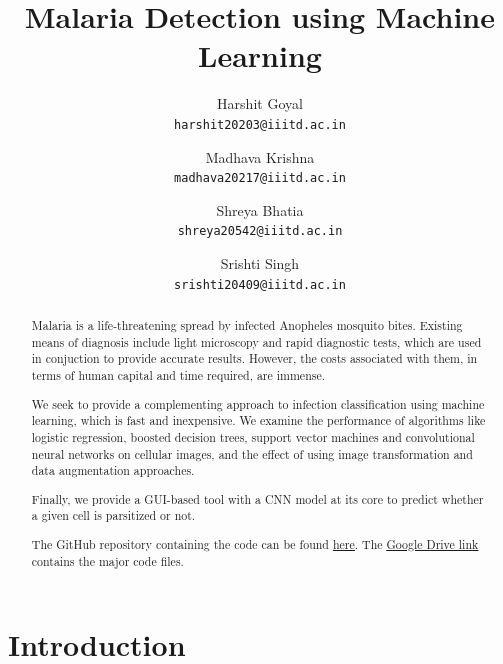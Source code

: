 \documentclass[10pt,twocolumn,letterpaper]{article}
\begin{document}
\title{Malaria Detection using Machine Learning}

\author{Harshit Goyal\\
{\tt\small harshit20203@iiitd.ac.in}
\and
Madhava Krishna\\
{\tt\small madhava20217@iiitd.ac.in}
\and
Shreya Bhatia\\
{\tt\small shreya20542@iiitd.ac.in}
\and
Srishti Singh\\
{\tt\small srishti20409@iiitd.ac.in}
}

\maketitle

\begin{abstract}
   Malaria is a life-threatening spread by infected Anopheles mosquito bites. Existing means of diagnosis include light microscopy and rapid diagnostic tests, which are used in conjuction to provide accurate results. However, the costs associated with them, in terms of human capital and time required, are immense.
   
   We seek to provide a complementing approach to infection classification using machine learning, which is fast and inexpensive. We examine the performance of algorithms like logistic regression, boosted decision trees, support vector machines and convolutional neural networks on cellular images, and the  effect of using image transformation and data augmentation approaches.

   Finally, we provide a GUI-based tool with a CNN model at its core to predict whether a given cell is parsitized or not.

   The GitHub repository containing the code can be found \href{https://github.com/madhava20217/Malaria-Detection-from-Cells}{\underline{here}}. The \href{https://drive.google.com/drive/u/0/folders/1_r2lBXp5v5bqp2ctHvTG2FAWc-aGdpmD}{\underline{Google Drive link}} contains the major code files.
\end{abstract}

\section{Introduction}
\end{document}
